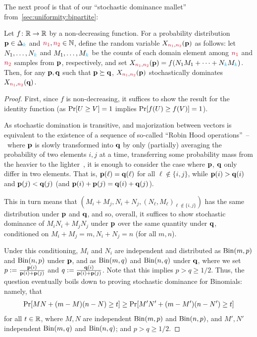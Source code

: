 The next proof is that of our ``stochastic dominance mallet'' from~\cref{sec:uniformity:bipartite}:
\begin{theorem}
  Let $f\colon \mathbb{R}\to\mathbb{R}$ by a non-decreasing function. For a probability distribution $\mathbf{p}\in\Delta_{{\textcolor{cyan}{k}}}$ and $\textcolor{red}{{\textcolor{purple}{n}}_1},\textcolor{red}{{\textcolor{purple}{n}}_2}\in\mathbb{N}$, define the random variable $X_{\textcolor{red}{{\textcolor{purple}{n}}_1},\textcolor{red}{{\textcolor{purple}{n}}_2}}(\mathbf{p})$ as follows: let $N_1,\dots,N_{\textcolor{cyan}{k}}$ and $M_1,\dots,M_{\textcolor{cyan}{k}}$ be the counts of each domain element among $\textcolor{red}{{\textcolor{purple}{n}}_1}$ and $\textcolor{red}{{\textcolor{purple}{n}}_2}$ \iid samples from $\mathbf{p}$, respectively, and set $X_{\textcolor{red}{{\textcolor{purple}{n}}_1},\textcolor{red}{{\textcolor{purple}{n}}_2}}(\mathbf{p})=f(N_1M_1+\dots+N_{\textcolor{cyan}{k}} M_{\textcolor{cyan}{k}})$. Then, for any $\mathbf{p},\mathbf{q}$ such that $\mathbf{p}\succeq\mathbf{q}$, $X_{\textcolor{red}{{\textcolor{purple}{n}}_1},\textcolor{red}{{\textcolor{purple}{n}}_2}}(\mathbf{p})$ stochastically dominates $X_{\textcolor{red}{{\textcolor{purple}{n}}_1},\textcolor{red}{{\textcolor{purple}{n}}_2}}(\mathbf{q})$.
\end{theorem}
\begin{proof}
First, since $f$ is non-decreasing, it suffices to show the result for the identity function (as $\bPr{U\geq V}=1$ implies $\bPr{f(U)\geq f(V)}=1$). 

As stochastic domination is transitive, and majorization between vectors is equivalent to the existence of a sequence of so-called ``Robin Hood operations''~--~where $\mathbf{p}$ is slowly transformed into $\mathbf{q}$ by only (partially) averaging the probability of two elements $i,j$ at a time, transferring some probability mass from the heavier to the lighter~\citep[Chapter~2]{Arnold87}, it is enough to consider the case where $\mathbf{p}$, $\mathbf{q}$ only differ in two elements. That is, $\mathbf{p}(\ell)=\mathbf{q}(\ell)$ for all $\ell\notin\{i,j\}$, while $\mathbf{p}(i) > \mathbf{q}(i)$ and $\mathbf{p}(j) < \mathbf{q}(j)$ (and $\mathbf{p}(i)+\mathbf{p}(j)=\mathbf{q}(i)+\mathbf{q}(j)$).

This in turn means that $(M_i+M_j, N_i+N_j, (N_\ell,M_\ell)_{\ell\notin\{i,j\}})$ has the same distribution under $\mathbf{p}$ and $\mathbf{q}$, and so, overall, it suffices to show stochastic dominance of $M_iN_i+M_jN_j$ under $\mathbf{p}$ over the same quantity under $\mathbf{q}$, conditioned on $M_i+M_j=m, N_i+N_j=n$ (for all $m,n$).

Under this conditioning, $M_i$ and $N_i$ are independent and distributed as $\binomial{m}{p}$ and $\binomial{n}{p}$ under $\mathbf{p}$, and as $\binomial{m}{q}$ and $\binomial{n}{q}$ under $\mathbf{q}$, where we set
$p := \frac{\mathbf{p}(i)}{\mathbf{p}(i)+\mathbf{p}(j)}$ 
and
$q := \frac{\mathbf{q}(i)}{\mathbf{p}(i)+\mathbf{p}(j)}$. Note that this implies $p > q \geq 1/2$. Thus, the question eventually boils down to proving stochastic dominance for Binomials: namely, that
\[
    \bPr{MN+(m-M)(n-N) \geq t} \geq \bPr{M'N'+(m-M')(n-N') \geq t}
\]
for all $t\in \mathbb{R}$, where $M,N$ are independent $\binomial{m}{p}$ and $\binomial{n}{p}$, and $M',N'$ independent $\binomial{m}{q}$ and $\binomial{n}{q}$; and $p>q\geq 1/2$.


\end{proof}

